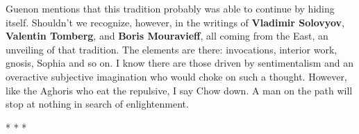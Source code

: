 Guenon mentions that this tradition probably was able to continue by hiding itself. Shouldn't we recognize, however, in the writings of \textbf{Vladimir Solovyov}, \textbf{Valentin Tomberg}, and \textbf{Boris Mouravieff}, all coming from the East, an unveiling of that tradition. The elements are there: invocations, interior work, gnosis, Sophia and so on. I know there are those driven by sentimentalism and an overactive subjective imagination who would choke on such a thought. However, like the Aghoris who eat the repulsive, I say Chow down. A man on the path will stop at nothing in search of enlightenment.



\begin{center}* * *\end{center}

